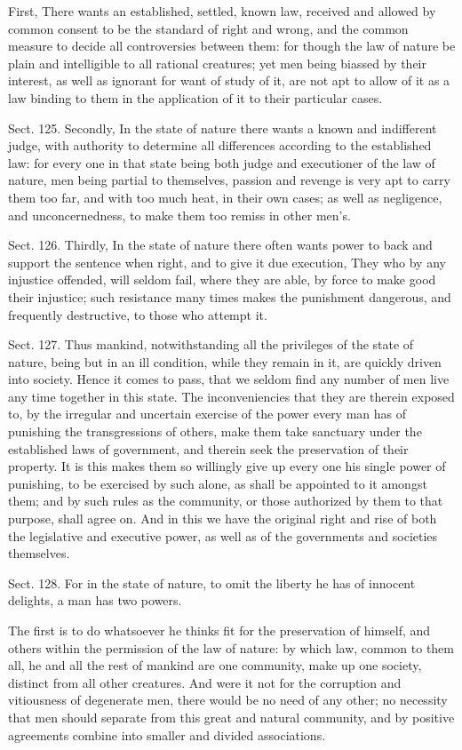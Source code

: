 \documentclass[11pt,openany]{book}
\begin{document}
First, There wants an established, settled, known law, received and allowed by common consent to be the standard of right and wrong, and the common measure to decide all controversies between them: for though the law of nature be plain and intelligible to all rational creatures; yet men being biassed by their interest, as well as ignorant for want of study of it, are not apt to allow of it as a law binding to them in the application of it to their particular cases.

Sect. 125. Secondly, In the state of nature there wants a known and indifferent judge, with authority to determine all differences according to the established law: for every one in that state being both judge and executioner of the law of nature, men being partial to themselves, passion and revenge is very apt to carry them too far, and with too much heat, in their own cases; as well as negligence, and unconcernedness, to make them too remiss in other men's.

Sect. 126. Thirdly, In the state of nature there often wants power to back and support the sentence when right, and to give it due execution, They who by any injustice offended, will seldom fail, where they are able, by force to make good their injustice; such resistance many times makes the punishment dangerous, and frequently destructive, to those who attempt it.

Sect. 127. Thus mankind, notwithstanding all the privileges of the state of nature, being but in an ill condition, while they remain in it, are quickly driven into society. Hence it comes to pass, that we seldom find any number of men live any time together in this state. The inconveniencies that they are therein exposed to, by the irregular and uncertain exercise of the power every man has of punishing the transgressions of others, make them take sanctuary under the established laws of government, and therein seek the preservation of their property. It is this makes them so willingly give up every one his single power of punishing, to be exercised by such alone, as shall be appointed to it amongst them; and by such rules as the community, or those authorized by them to that purpose, shall agree on. And in this we have the original right and rise of both the legislative and executive power, as well as of the governments and societies themselves.

Sect. 128. For in the state of nature, to omit the liberty he has of innocent delights, a man has two powers.

The first is to do whatsoever he thinks fit for the preservation of himself, and others within the permission of the law of nature: by which law, common to them all, he and all the rest of mankind are one community, make up one society, distinct from all other creatures. And were it not for the corruption and vitiousness of degenerate men, there would be no need of any other; no necessity that men should separate from this great and natural community, and by positive agreements combine into smaller and divided associations.
\end{document}
